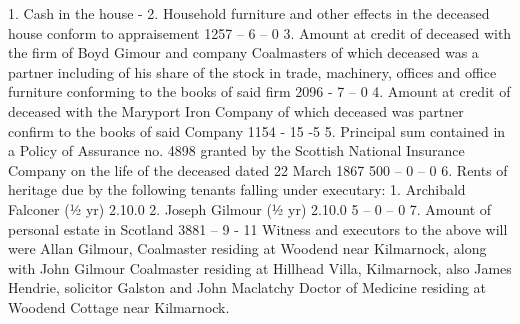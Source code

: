     1. Cash in the house -
    2. Household furniture and other effects in the deceased house
    conform to appraisement 1257 – 6 – 0
    3. Amount at credit of deceased with the firm of Boyd Gimour and
    company Coalmasters of which deceased was a partner including
    of his share of the stock in trade, machinery, offices and office
    furniture conforming to the books of said firm 2096 - 7 – 0
    4. Amount at credit of deceased with the Maryport Iron Company
    of which deceased was partner confirm to the books of said
    Company 1154 - 15 -5
    5. Principal sum contained in a Policy of Assurance no. 4898
    granted by the Scottish National Insurance Company on the life
    of the deceased dated 22 March 1867 500 – 0 – 0
    6. Rents of heritage due by the following tenants falling under
    executary: 1. Archibald Falconer (½ yr) 2.10.0
    2. Joseph Gilmour (½ yr) 2.10.0 5 – 0 – 0
    7. Amount of personal estate in Scotland 3881 – 9 - 11 
    Witness and executors to the above will were Allan Gilmour, Coalmaster residing at Woodend near Kilmarnock, along with John Gilmour Coalmaster residing at Hillhead Villa, Kilmarnock, also James Hendrie, solicitor Galston and John Maclatchy Doctor of Medicine residing at Woodend Cottage near Kilmarnock.
